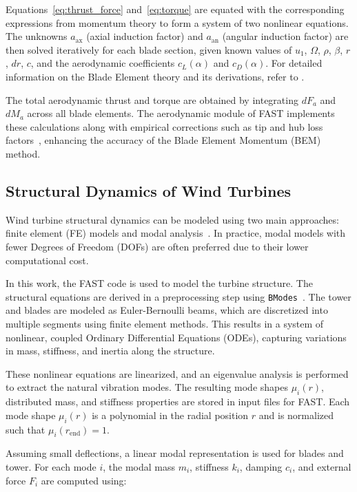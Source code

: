 Equations~\eqref{eq:thrust_force} and~\eqref{eq:torque} are equated with the corresponding expressions from momentum theory to form a system of two nonlinear equations. The unknowns $a_{\text{ax}}$ (axial induction factor) and $a_{\text{an}}$ (angular induction factor) are then solved iteratively for each blade section, given known values of $u_1$, $\Omega$, $\rho$, $\beta$, $r$, $dr$, $c$, and the aerodynamic coefficients $c_L(\alpha)$ and $c_D(\alpha)$.
For detailed information on the Blade Element theory and its derivations, refer to \cite{ingram2011blade}.

The total aerodynamic thrust and torque are obtained by integrating $dF_a$ and $dM_a$ across all blade elements. The aerodynamic module of FAST implements these calculations along with empirical corrections such as tip and hub loss factors~\cite{fastV3}, enhancing the accuracy of the Blade Element Momentum (BEM) method.
         
\subsection{Structural Dynamics of Wind Turbines}

Wind turbine structural dynamics can be modeled using two main approaches: finite element (FE) models and modal analysis~\cite{ref:modal_analysis}. In practice, modal models with fewer Degrees of Freedom (DOFs) are often preferred due to their lower computational cost.

In this work, the FAST code is used to model the turbine structure. The structural equations are derived in a preprocessing step using \texttt{BModes}~\cite{ref:bmodes}. The tower and blades are modeled as Euler-Bernoulli beams, which are discretized into multiple segments using finite element methods. This results in a system of nonlinear, coupled Ordinary Differential Equations (ODEs), capturing variations in mass, stiffness, and inertia along the structure.

These nonlinear equations are linearized, and an eigenvalue analysis is performed to extract the natural vibration modes. The resulting mode shapes $\mu_i(r)$, distributed mass, and stiffness properties are stored in input files for FAST. Each mode shape $\mu_i(r)$ is a polynomial in the radial position $r$ and is normalized such that $\mu_i(r_{\text{end}}) = 1$.

Assuming small deflections, a linear modal representation is used for blades and tower. For each mode $i$, the modal mass $m_i$, stiffness $k_i$, damping $c_i$, and external force $F_i$ are computed using:

